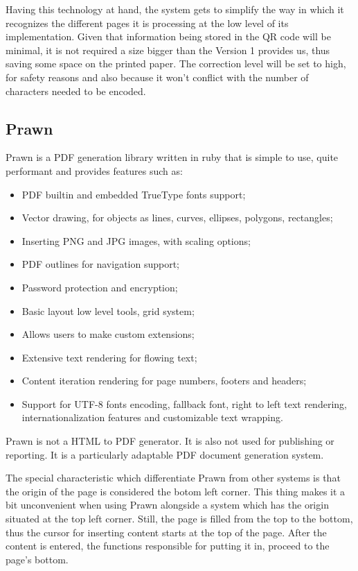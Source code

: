 Having this technology at hand, the system gets to simplify the way in which it recognizes the different pages it is processing at the low level of its implementation. Given that information being stored in the QR code will be minimal, it is not required a size bigger than the Version 1 provides us, thus saving some space on the printed paper. The correction level will be set to high, for safety reasons and also because it won’t conflict with the number of characters needed to be encoded.


\subsection{Prawn}
Prawn is a PDF generation library written in ruby that is simple to use, quite performant and provides features such as:

\begin{itemize} 
  \item PDF builtin and embedded TrueType fonts support;
  \item Vector drawing, for objects as lines, curves, ellipses, polygons, rectangles;
  \item Inserting PNG and JPG images, with scaling options;
  \item PDF outlines for navigation support;
  \item Password protection and encryption;
  \item Basic layout low level tools, grid system;
  \item Allows users to make custom extensions;
  \item Extensive text rendering for flowing text;
  \item Content iteration rendering for page numbers, footers and headers;
  \item Support for UTF-8 fonts encoding, fallback font, right to left text rendering, internationalization features and customizable text wrapping.
\end{itemize}

Prawn is not a HTML to PDF generator. It is also not used for publishing or reporting. It is a particularly adaptable PDF document generation system. 

The special characteristic which differentiate Prawn from other systems is that the origin of the page is considered the botom left corner. This thing makes it a bit unconvenient when using Prawn alongside a system which has the origin situated at the top left corner. Still, the page is filled from the top to the bottom, thus the cursor for inserting content starts at the top of the page. After the content is entered, the functions responsible for putting it in, proceed to the page's bottom.

